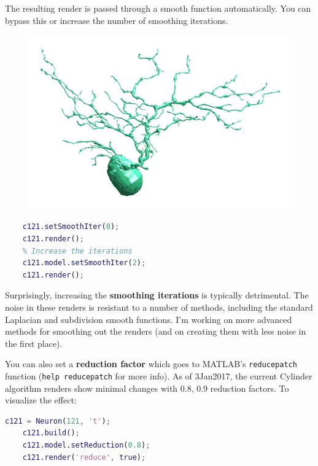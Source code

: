 \documentclass[12pt]{exam}
\begin{document}
	The resulting render is passed through a smooth function automatically. You can bypass this or increase the number of smoothing iterations.\\
	\begin{figure}
		\includegraphics[width=\linewidth]{c6_render}
		\label{c6render}
	\end{figure}
	\begin{lstlisting}[language=matlab]
	% No smoothing
	c121.setSmoothIter(0);
	c121.render();
	% Increase the iterations
	c121.model.setSmoothIter(2); 
	c121.render();\end{lstlisting}
	Surprisingly, increasing the \textbf{smoothing iterations} is typically detrimental. The noise in these renders is resistant to a number of methods, including the standard Laplacian and subdivision smooth functions. I'm working on more advanced methods for smoothing out the renders (and on creating them with less noise in the first place).
	
	You can also set a \textbf{reduction factor} which goes to MATLAB's \texttt{reducepatch} function (\texttt{help reducepatch} for more info). As of 3Jan2017, the current Cylinder algorithm renders show minimal changes with 0.8, 0.9 reduction factors. To visualize the effect:
	\begin{lstlisting}[language=matlab]
	c121 = Neuron(121, 't');
	c121.build();
	c121.model.setReduction(0.8);
	c121.render('reduce', true);\end{lstlisting}
\end{document}
